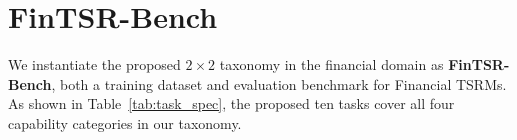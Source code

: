 \section{FinTSR-Bench}
\label{sec:benchmark}

We instantiate the proposed $2 \times 2$ taxonomy in the financial domain as \textbf{FinTSR-Bench}, both a training dataset and evaluation benchmark for Financial TSRMs.
As shown in Table~\ref{tab:task_spec}, the proposed
ten tasks
cover all four capability categories in our taxonomy.


\setlength{\columnsep}{9pt} 
\begin{table}
\vspace{-12pt}
\centering
\caption{\textbf{Data splits of FinTSR-Bench.} Three test sets systematically vary stock universe and time period to evaluate both \textcolor{red}{ID} and \textcolor{blue}{OOD}.}
\label{tab:splits}
\vspace{-10pt}
\end{table}

